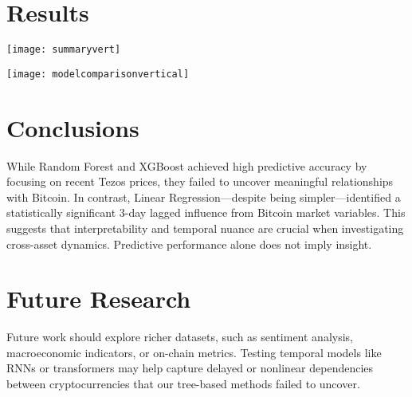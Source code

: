 \documentclass[a0,portrait]{hogent-poster}
\begin{document}
\begin{multicols}{3}
\section{Results}

\begin{center}
  \captionsetup{type=figure}
  \texttt{[image: summaryvert]}
\end{center}

\begin{center}
  \captionsetup{type=figure}
  \texttt{[image: modelcomparisonvertical]}
\end{center}

\section{Conclusions}

While Random Forest and XGBoost achieved high predictive accuracy by focusing on recent Tezos prices, they failed to uncover meaningful relationships with Bitcoin. In contrast, Linear Regression—despite being simpler—identified a statistically significant 3-day lagged influence from Bitcoin market variables. This suggests that interpretability and temporal nuance are crucial when investigating cross-asset dynamics. Predictive performance alone does not imply insight.

\section{Future Research}

Future work should explore richer datasets, such as sentiment analysis, macroeconomic indicators, or on-chain metrics. Testing temporal models like RNNs or transformers may help capture delayed or nonlinear dependencies between cryptocurrencies that our tree-based methods failed to uncover.
\end{multicols}
\end{document}
